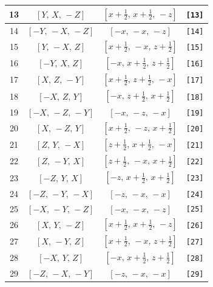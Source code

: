 \documentclass[fleqn,8pt]{jsarticle}
\begin{document}
\begin{longtable}{cccc}
13 & $\left[ Y,\, X,\, - Z \right]$ & $\left[ x + \frac{1}{2},\, x + \frac{1}{2},\, - z \right]$ & {\tt [13]} \\ \hline
14 & $\left[ - Y,\, - X,\, - Z \right]$ & $\left[ - x,\, - x,\, - z \right]$ & {\tt [14]} \\ \hline
15 & $\left[ Y,\, - X,\, Z \right]$ & $\left[ x + \frac{1}{2},\, - x,\, z + \frac{1}{2} \right]$ & {\tt [15]} \\ \hline
16 & $\left[ - Y,\, X,\, Z \right]$ & $\left[ - x,\, x + \frac{1}{2},\, z + \frac{1}{2} \right]$ & {\tt [16]} \\ \hline
17 & $\left[ X,\, Z,\, - Y \right]$ & $\left[ x + \frac{1}{2},\, z + \frac{1}{2},\, - x \right]$ & {\tt [17]} \\ \hline
18 & $\left[ - X,\, Z,\, Y \right]$ & $\left[ - x,\, z + \frac{1}{2},\, x + \frac{1}{2} \right]$ & {\tt [18]} \\ \hline
19 & $\left[ - X,\, - Z,\, - Y \right]$ & $\left[ - x,\, - z,\, - x \right]$ & {\tt [19]} \\ \hline
20 & $\left[ X,\, - Z,\, Y \right]$ & $\left[ x + \frac{1}{2},\, - z,\, x + \frac{1}{2} \right]$ & {\tt [20]} \\ \hline
21 & $\left[ Z,\, Y,\, - X \right]$ & $\left[ z + \frac{1}{2},\, x + \frac{1}{2},\, - x \right]$ & {\tt [21]} \\ \hline
22 & $\left[ Z,\, - Y,\, X \right]$ & $\left[ z + \frac{1}{2},\, - x,\, x + \frac{1}{2} \right]$ & {\tt [22]} \\ \hline
23 & $\left[ - Z,\, Y,\, X \right]$ & $\left[ - z,\, x + \frac{1}{2},\, x + \frac{1}{2} \right]$ & {\tt [23]} \\ \hline
24 & $\left[ - Z,\, - Y,\, - X \right]$ & $\left[ - z,\, - x,\, - x \right]$ & {\tt [24]} \\ \hline
25 & $\left[ - X,\, - Y,\, - Z \right]$ & $\left[ - x,\, - x,\, - z \right]$ & {\tt [25]} \\ \hline
26 & $\left[ X,\, Y,\, - Z \right]$ & $\left[ x + \frac{1}{2},\, x + \frac{1}{2},\, - z \right]$ & {\tt [26]} \\ \hline
27 & $\left[ X,\, - Y,\, Z \right]$ & $\left[ x + \frac{1}{2},\, - x,\, z + \frac{1}{2} \right]$ & {\tt [27]} \\ \hline
28 & $\left[ - X,\, Y,\, Z \right]$ & $\left[ - x,\, x + \frac{1}{2},\, z + \frac{1}{2} \right]$ & {\tt [28]} \\ \hline
29 & $\left[ - Z,\, - X,\, - Y \right]$ & $\left[ - z,\, - x,\, - x \right]$ & {\tt [29]} \\ \hline

\end{longtable}
\end{document}
